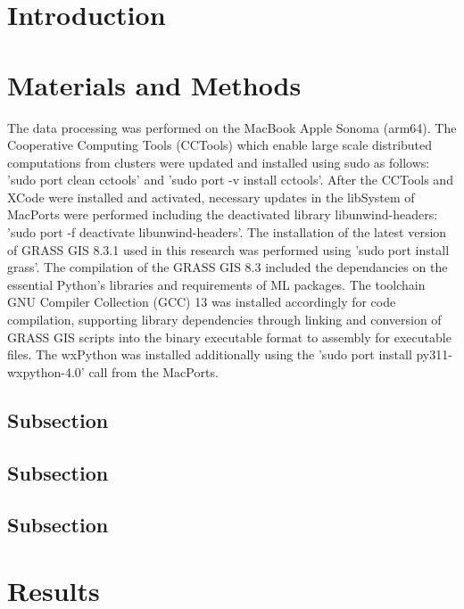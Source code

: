 \documentclass[coasts,article,submit,pdftex,moreauthors]{Definitions/mdpi}
\begin{document}
\section{Introduction}

\section{Materials and Methods}

The data processing was performed on the MacBook Apple Sonoma (arm64). The Cooperative Computing Tools (CCTools) which enable large scale distributed computations from clusters were updated and installed using sudo as follows: 'sudo port clean cctools' and 'sudo port -v install cctools'. After the CCTools and XCode were installed and activated, necessary updates in the libSystem of MacPorts were performed including the deactivated library libunwind-headers: 'sudo port -f deactivate libunwind-headers'. The installation of the latest version of GRASS GIS 8.3.1 used in this research was performed using 'sudo port install grass'. The compilation of the GRASS GIS 8.3 included the dependancies on the essential Python's libraries and requirements of ML packages. The toolchain GNU Compiler Collection (GCC) 13 was installed accordingly for code compilation, supporting library dependencies through linking and conversion of GRASS GIS scripts into the binary executable format to assembly for executable files. The wxPython was installed additionally using the 'sudo port install py311-wxpython-4.0' call from the MacPorts.

\subsection{Subsection}

\subsection{Subsection}

\subsection{Subsection}

\section{Results}
\end{document}
